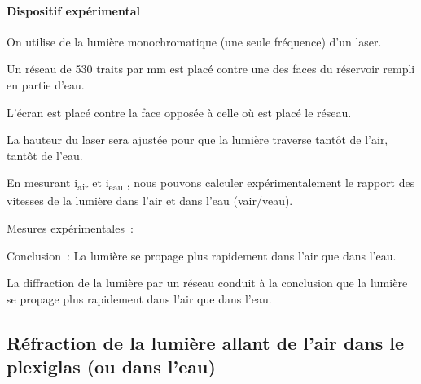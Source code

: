 \paragraph{Dispositif expérimental}

On utilise de la lumière monochromatique (une seule fréquence) d'un
laser.

Un réseau de 530 traits par mm est placé contre une des faces du
réservoir rempli en partie d'eau.

L'écran est placé contre la face opposée à celle où est placé le réseau.

La hauteur du laser sera ajustée pour que la lumière traverse tantôt de
l'air, tantôt de l'eau.

En mesurant i\textsubscript{air} et i\textsubscript{eau }, nous pouvons
calculer expérimentalement le rapport des vitesses de la lumière dans
l'air et dans l'eau (vair/veau).

Mesures expérimentales~:
\begin{enumerate}
	\item Mesure de $i$ dans l'air~:
	\item Mesure de $i$ dans l'eau~:
	\item Calculer le rapport $\frac{v_\text{air}}{v_\text{eau}}} $ sachant
que $ V= ??$ 

\end{enumerate}


Conclusion~: La lumière se propage plus rapidement dans l'air que dans
l'eau.

La diffraction de la lumière par un réseau conduit à la
conclusion que la lumière se propage plus rapidement dans l'air que dans
l'eau.

\subsection{Réfraction de la lumière allant de l'air dans le plexiglas (ou dans l'eau)}

